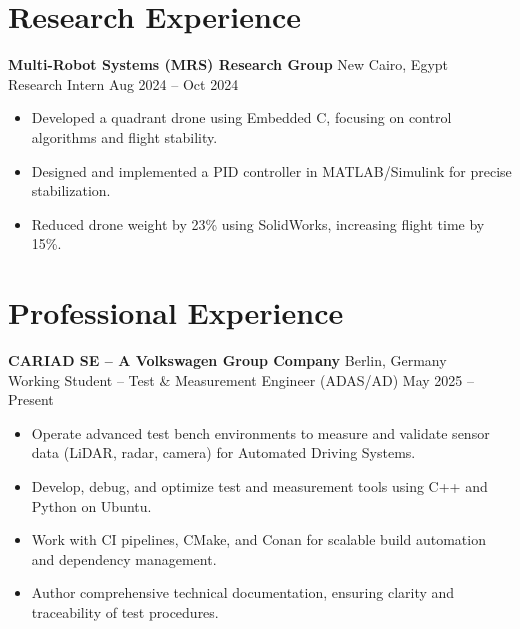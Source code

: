 \documentclass[a4paper,10pt]{article}
\begin{document}
\vspace{0.6em}

\section*{Research Experience}
\textbf{Multi-Robot Systems (MRS) Research Group} \hfill New Cairo, Egypt\\
Research Intern \hfill Aug 2024 -- Oct 2024
\begin{itemize}[noitemsep,topsep=0pt]
    \item Developed a quadrant drone using Embedded C, focusing on control algorithms and flight stability.
    \item Designed and implemented a PID controller in MATLAB/Simulink for precise stabilization.
    \item Reduced drone weight by 23\% using SolidWorks, increasing flight time by 15\%.
\end{itemize}

\vspace{0.6em}

\section*{Professional Experience}
\textbf{CARIAD SE – A Volkswagen Group Company} \hfill Berlin, Germany\\
Working Student – Test \& Measurement Engineer (ADAS/AD) \hfill May 2025 -- Present
\begin{itemize}[noitemsep,topsep=0pt]
    \item Operate advanced test bench environments to measure and validate sensor data (LiDAR, radar, camera) for Automated Driving Systems.
    \item Develop, debug, and optimize test and measurement tools using C++ and Python on Ubuntu.
    \item Work with CI pipelines, CMake, and Conan for scalable build automation and dependency management.
    \item Author comprehensive technical documentation, ensuring clarity and traceability of test procedures.
\end{itemize}

\vspace{0.6em}
\end{document}
